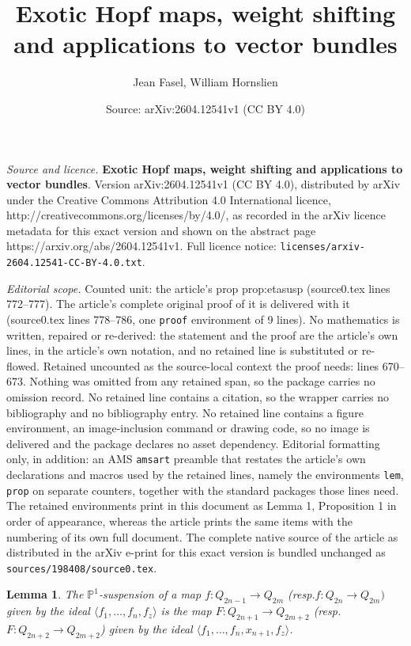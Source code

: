 \documentclass[10pt,a4paper]{amsart}
\title{{\bf Exotic Hopf maps, weight shifting and applications to vector bundles}}
\author{Jean Fasel, William Hornslien}
\date{Source: arXiv:2604.12541v1 (CC BY 4.0)}
\newtheorem{lem}{Lemma}
\newcommand{\pone}{{\mathbb P}^1}
\begin{document}
\maketitle

\noindent\emph{Source and licence.} {\bf Exotic Hopf maps, weight shifting and applications to vector bundles}. Version arXiv:2604.12541v1 (CC BY 4.0), distributed by arXiv under the Creative Commons Attribution 4.0 International licence, http://creativecommons.org/licenses/by/4.0/, as recorded in the arXiv licence metadata for this exact version and shown on the abstract page https://arxiv.org/abs/2604.12541v1. Full licence notice: \texttt{licenses/arxiv-2604.12541-CC-BY-4.0.txt}.\par\smallskip

\noindent\textit{Editorial scope.} Counted unit: the article's prop prop:etasusp (source0.tex lines 772--777). The article's complete original proof of it is delivered with it (source0.tex lines 778--786, one \texttt{proof} environment of 9 lines). No mathematics is written, repaired or re-derived: the statement and the proof are the article's own lines, in the article's own notation, and no retained line is substituted or re-flowed.  Retained uncounted as the source-local context the proof needs: lines 670--673.  Nothing was omitted from any retained span, so the package carries no omission record.  No retained line contains a citation, so the wrapper carries no bibliography and no bibliography entry.  No retained line contains a figure environment, an image-inclusion command or drawing code, so no image is delivered and the package declares no asset dependency.  Editorial formatting only, in addition: an AMS \texttt{amsart} preamble that restates the article's own declarations and macros used by the retained lines, namely the environments \texttt{lem}, \texttt{prop} on separate counters, together with the standard packages those lines need.  The retained environments print in this document as Lemma 1, Proposition 1 in order of appearance, whereas the article prints the same items with the numbering of its own full document.  The complete native source of the article as distributed in the arXiv e-print for this exact version is bundled unchanged as \texttt{sources/198408/source0.tex}.
\begin{lem}
\label{lem:ponesuspoddeven}
The $\pone$-suspension of a map $f:Q_{2n-1}\to Q_{2m}$ (resp.$f:Q_{2n}\to Q_{2m})$  given by the ideal $\langle f_1, \ldots, f_n, f_z \rangle $ is the map $F:Q_{2n+1}\to Q_{2m+2}$ (resp. $F:Q_{2n+2}\to Q_{2m+2}$) given by the ideal $\langle f_1, \ldots, f_n, x_{n+1},f_z \rangle$.
\end{lem}
\end{document}

